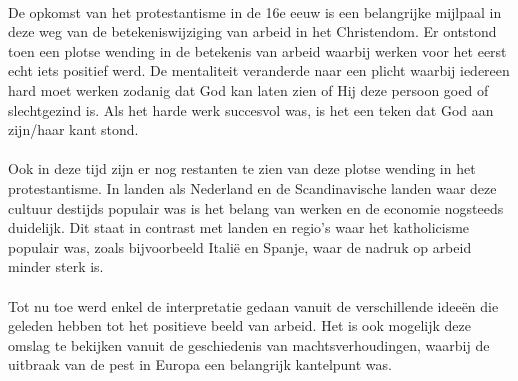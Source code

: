 \documentclass[../summary.tex]{subfiles}
\begin{document}
	\\
	De opkomst van het protestantisme in de 16e eeuw is een belangrijke mijlpaal in deze weg van de betekeniswijziging van arbeid in het Christendom. Er ontstond toen een plotse wending in de betekenis van arbeid waarbij werken voor het eerst echt iets positief werd. De mentaliteit veranderde naar een plicht waarbij iedereen hard moet werken zodanig dat God kan laten zien of Hij deze persoon goed of slechtgezind is. Als het harde werk  succesvol was, is het een teken dat God aan zijn/haar kant stond.\\
	\\
	Ook in deze tijd zijn er nog restanten te zien van deze plotse wending in het protestantisme. In landen als Nederland en de Scandinavische landen waar deze cultuur destijds populair was is het belang van werken en de economie nogsteeds duidelijk. Dit staat in contrast met landen en regio's waar het katholicisme populair was, zoals bijvoorbeeld Italië en Spanje, waar de nadruk op arbeid minder sterk is.\\
	\\
	Tot nu toe werd enkel de interpretatie gedaan vanuit de verschillende ideeën die geleden hebben tot het positieve beeld van arbeid. Het is ook mogelijk deze omslag te bekijken vanuit de geschiedenis van machtsverhoudingen, waarbij de uitbraak van de pest in Europa een belangrijk  kantelpunt was.\\
	\\
\end{document}
